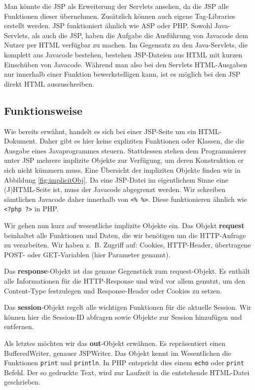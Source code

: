 Man könnte die JSP als Erweiterung der Servlets ansehen, da die JSP alle Funktionen dieser übernehmen. Zusätzlich können auch eigene Tag-Libraries erstellt werden. JSP funktioniert ähnlich wie ASP oder PHP. Sowohl Java-Servlets, als auch die JSP, haben die Aufgabe die Ausführung von Javacode dem Nutzer  per HTML verfügbar zu machen. Im Gegensatz zu den Java-Servlets, die komplett aus Javacode bestehen, bestehen JSP-Dateien aus HTML mit kurzen Einschüben von Javacode. Während man also bei den Servlets HTML-Ausgaben nur innerhalb einer Funktion bewerkstelligen kann, ist es möglich bei den JSP direkt HTML auszuschreiben.

\subsection{Funktionsweise}

Wie bereits erwähnt, handelt es sich bei einer JSP-Seite um ein HTML-Dokument. Daher gibt es hier keine expliziten Funktionen oder Klassen, die die Ausgabe eines Javaprogrammes steuern. Stattdessen stehen dem Programmierer unter JSP mehrere implizite Objekte zur Verfügung, um deren Konstruktion er sich nicht kümmern muss. Eine Übersicht der impliziten Objekte finden wir in Abbildung \ref{fig:implicitObj}. Da eine JSP-Datei im eigentlichem Sinne eine (J)HTML-Seite ist, muss der Javacode abgegrenzt werden. Wir schreiben sämtlichen Javacode daher innerhalb von \verb|<% %>|. Diese funktionieren ähnlich wie \verb|<?php ?>| in PHP.

Wir gehen nun kurz auf wesentliche implizite Objekte ein. Das Objekt \textbf{request} beinhaltet alle Funktionen und Daten, die wir benötigen um die HTTP-Anfrage zu verarbeiten. Wir haben \mbox{z. B.} Zugriff auf: Cookies, HTTP-Header, übertragene POST- oder GET-Variablen (hier Parameter genannt).

Das \textbf{response}-Objekt ist das genaue Gegenstück zum request-Objekt. Es enthält alle Informationen für die HTTP-Response und wird vor allem genutzt, um den Content-Type festzulegen und Response-Header oder Cookies zu setzen. 

Das \textbf{session}-Objekt regelt alle wichtigen Funktionen für die aktuelle Session. Wir können hier die Session-ID abfragen sowie Objekte zur Session hinzufügen und entfernen.

Als letztes möchten wir das \textbf{out}-Objekt erwähnen. Es repräsentiert einen BufferedWriter, genauer JSPWriter. Das Objekt kennt im Wesentlichen die Funktionen \verb|print| und \verb|println|. In PHP entspricht dies einem \verb|echo| oder \verb|print| Befehl. Der so gedruckte Text, wird zur Laufzeit in die entstehende HTML-Datei geschrieben. 

